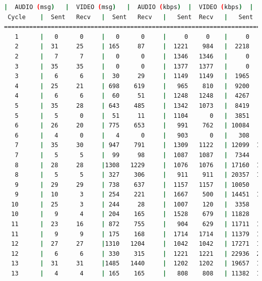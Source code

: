 \begin{lstlisting}[language=bash,basicstyle=\ttfamily\scriptsize]
          |  AUDIO (msg)   |  VIDEO (msg)   |  AUDIO (kbps)  |  VIDEO (kbps)  |   CPU (%)
 Cycle    |  Sent   Recv   |  Sent   Recv   |   Sent  Recv   |   Sent  Recv   | Program System
============================================================================================
   1      |   0      0     |   0      0     |     0     0    |     0     0    |   0      0
   2      |  31     25     | 165     87     |  1221    984   |  2218   1171   |  33     69
   2      |   7      7     |   0      0     |  1346   1346   |     0      0   |  41     70
   3      |  35     35     |   0      0     |  1377   1377   |     0      0   |  43     75
   3      |   6      6     |  30     29     |  1149   1149   |  1965   1899   |  35     76
   4      |  25     21     | 698    619     |   965    810   |  9200   8158   |  31     71
   4      |   6      6     |  60     51     |  1248   1248   |  4267   3627   |  19     70
   5      |  35     28     | 643    485     |  1342   1073   |  8419   6350   |  29     69
   5      |   5      0     |  51     11     |  1104      0   |  3851    830   |  20     68
   6      |  26     20     | 775    653     |   991    762   | 10084   8497   |  27     68
   6      |   4      0     |   4      0     |   903      0   |   308      0   |  13     69
   7      |  35     30     | 947    791     |  1309   1122   | 12099  10106   |  37     70
   7      |   5      5     |  99     98     |  1087   1087   |  7344   7270   |  13     70
   8      |  28     28     |1308   1229     |  1076   1076   | 17160  16125   |  28     72
   8      |   5      5     | 327    306     |   911    911   | 20357  19037   |  38     72
   9      |  29     29     | 738    637     |  1157   1157   | 10050   8676   |  31     71
   9      |  10      3     | 254    221     |  1667    500   | 14451  12570   |  30     71
  10      |  25      3     | 244     28     |  1007    120   |  3358    385   |  36     67
  10      |   9      4     | 204    165     |  1528    679   | 11828   9565   |  31     65
  11      |  23     16     | 872    755     |   904    629   | 11711  10143   |  34     73
  11      |   9      9     | 175    168     |  1714   1714   | 11379  10923   |  11     77
  12      |  27     27     |1310   1204     |  1042   1042   | 17271  15874   |  31     73
  12      |   6      6     | 330    315     |  1221   1221   | 22936  21892   |  31     70
  13      |  31     31     |1485   1440     |  1202   1202   | 19657  19064   |  28     67
  13      |   4      4     | 165    165     |   808    808   | 11382  11382   |  24     69

\end{lstlisting}
